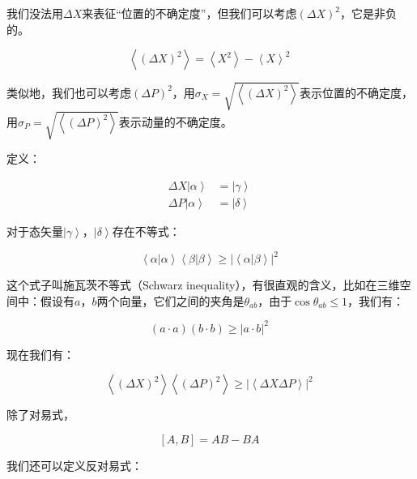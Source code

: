我们没法用$\Delta X$来表征“位置的不确定度”，但我们可以考虑$\left( \Delta X  \right)^2 $，它是非负的。

\begin{equation}
\left\langle  \left( \Delta X  \right)^2  \right\rangle = \left\langle X^2 \right\rangle - \left\langle X \right\rangle^2~
\end{equation}

类似地，我们也可以考虑$\left( \Delta P \right)^2 $，用$\sigma_X = \sqrt{ \left\langle  \left( \Delta X  \right)^2  \right\rangle  }$表示位置的不确定度，用$\sigma_P = \sqrt{ \left\langle  \left( \Delta P  \right)^2  \right\rangle  }$表示动量的不确定度。

定义：

\begin{align}
\Delta X \left| \alpha \right\rangle &= \left| \gamma \right\rangle \\
\Delta P \left| \alpha \right\rangle &= \left| \delta \right\rangle~
\end{align}

对于态矢量$\left| \gamma \right\rangle$，$\left| \delta \right\rangle$存在不等式：

\begin{equation}
\left\langle \alpha | \alpha \right\rangle \left\langle \beta | \beta \right\rangle \ge \left| \left\langle \alpha | \beta \right\rangle \right|^2~
\end{equation}

这个式子叫施瓦茨不等式（Schwarz inequality），有很直观的含义，比如在三维空间中：假设有$a$，$b$两个向量，它们之间的夹角是$\theta_{ab}$，由于$\cos \theta_{ab} \le 1$，我们有：

\begin{equation}
\left( a \cdot a \right) \left( b \cdot b \right) \ge \left| a \cdot b  \right|^2~
\end{equation}

现在我们有：

\begin{equation}
\left\langle \left( \Delta X \right)^2  \right\rangle \left\langle \left( \Delta P \right)^2  \right\rangle \ge \left|  \left\langle \Delta X \Delta P \right\rangle  \right|^2~
\end{equation}

除了对易式，

\begin{equation}
\left[ A, B \right] = AB - BA~
\end{equation}

我们还可以定义反对易式：


